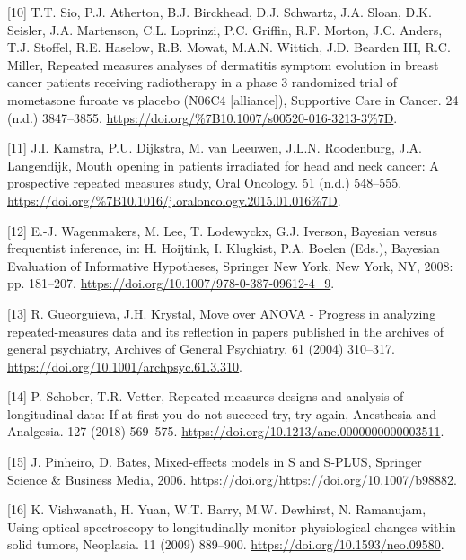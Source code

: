 \documentclass[
]{article}
\begin{document}
\leavevmode\hypertarget{ref-sio2016}{}%
{[}10{]} T.T. Sio, P.J. Atherton, B.J. Birckhead, D.J. Schwartz, J.A. Sloan, D.K. Seisler, J.A. Martenson, C.L. Loprinzi, P.C. Griffin, R.F. Morton, J.C. Anders, T.J. Stoffel, R.E. Haselow, R.B. Mowat, M.A.N. Wittich, J.D. Bearden III, R.C. Miller, Repeated measures analyses of dermatitis symptom evolution in breast cancer patients receiving radiotherapy in a phase 3 randomized trial of mometasone furoate vs placebo (N06C4 {[}alliance{]}), Supportive Care in Cancer. 24 (n.d.) 3847--3855. \url{https://doi.org/\%7B10.1007/s00520-016-3213-3\%7D}.

\leavevmode\hypertarget{ref-kamstra2015}{}%
{[}11{]} J.I. Kamstra, P.U. Dijkstra, M. van Leeuwen, J.L.N. Roodenburg, J.A. Langendijk, Mouth opening in patients irradiated for head and neck cancer: A prospective repeated measures study, Oral Oncology. 51 (n.d.) 548--555. \url{https://doi.org/\%7B10.1016/j.oraloncology.2015.01.016\%7D}.

\leavevmode\hypertarget{ref-wagenmakers2008}{}%
{[}12{]} E.-J. Wagenmakers, M. Lee, T. Lodewyckx, G.J. Iverson, Bayesian versus frequentist inference, in: H. Hoijtink, I. Klugkist, P.A. Boelen (Eds.), Bayesian Evaluation of Informative Hypotheses, Springer New York, New York, NY, 2008: pp. 181--207. \url{https://doi.org/10.1007/978-0-387-09612-4_9}.

\leavevmode\hypertarget{ref-gueorguieva2004}{}%
{[}13{]} R. Gueorguieva, J.H. Krystal, Move over ANOVA - Progress in analyzing repeated-measures data and its reflection in papers published in the archives of general psychiatry, Archives of General Psychiatry. 61 (2004) 310--317. \url{https://doi.org/10.1001/archpsyc.61.3.310}.

\leavevmode\hypertarget{ref-schober2018}{}%
{[}14{]} P. Schober, T.R. Vetter, Repeated measures designs and analysis of longitudinal data: If at first you do not succeed-try, try again, Anesthesia and Analgesia. 127 (2018) 569--575. \url{https://doi.org/10.1213/ane.0000000000003511}.

\leavevmode\hypertarget{ref-pinheiro2006}{}%
{[}15{]} J. Pinheiro, D. Bates, Mixed-effects models in S and S-PLUS, Springer Science \& Business Media, 2006. \url{https://doi.org/https://doi.org/10.1007/b98882}.

\leavevmode\hypertarget{ref-vishwanath2009}{}%
{[}16{]} K. Vishwanath, H. Yuan, W.T. Barry, M.W. Dewhirst, N. Ramanujam, Using optical spectroscopy to longitudinally monitor physiological changes within solid tumors, Neoplasia. 11 (2009) 889--900. \url{https://doi.org/10.1593/neo.09580}.
\end{document}
